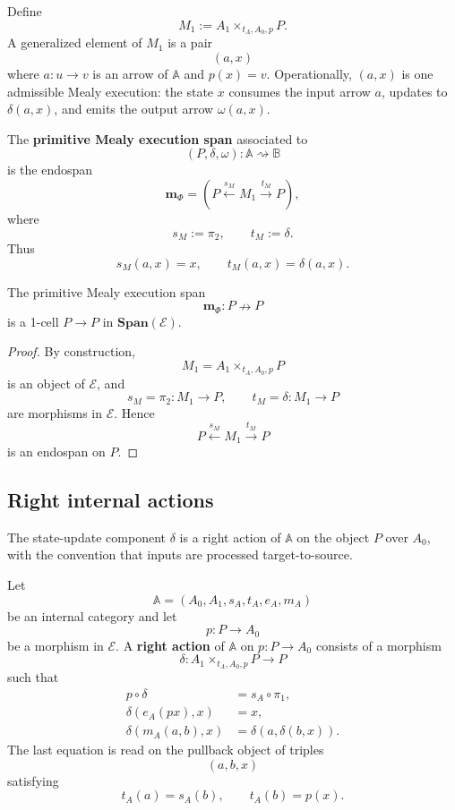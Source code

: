 Define
\[
M_1:=A_1\times_{t_A,A_0,p}P.
\]
A generalized element of \(M_1\) is a pair
\[
(a,x)
\]
where \(a:u\to v\) is an arrow of \(\mathbb A\) and \(p(x)=v\). Operationally, \((a,x)\) is one admissible Mealy execution: the state \(x\) consumes the input arrow \(a\), updates to \(\delta(a,x)\), and emits the output arrow \(\omega(a,x)\).

\begin{definition}
\label{def:primitive-mealy-execution-span}
The \textbf{primitive Mealy execution span} associated to
\[
(P,\delta,\omega):\mathbb A\rightsquigarrow\mathbb B
\]
is the endospan
\[
\mathbf m_\Phi
=
\left(
P
\xleftarrow{s_M}
M_1
\xrightarrow{t_M}
P
\right),
\]
where
\[
s_M:=\pi_2,
\qquad
t_M:=\delta.
\]
Thus
\[
s_M(a,x)=x,
\qquad
t_M(a,x)=\delta(a,x).
\]
\end{definition}

\begin{proposition}
\label{prop:primitive-execution-is-endospan}
The primitive Mealy execution span
\[
\mathbf m_\Phi:P\nrightarrow P
\]
is a 1-cell \(P\to P\) in \(\mathbf{Span}(\mathcal E)\).
\end{proposition}

\begin{proof}
By construction,
\[
M_1=A_1\times_{t_A,A_0,p}P
\]
is an object of \(\mathcal E\), and
\[
s_M=\pi_2:M_1\to P,
\qquad
t_M=\delta:M_1\to P
\]
are morphisms in \(\mathcal E\). Hence
\[
P\xleftarrow{s_M}M_1\xrightarrow{t_M}P
\]
is an endospan on \(P\).
\end{proof}

\subsection{Right internal actions}

The state-update component \(\delta\) is a right action of \(\mathbb A\) on the object \(P\) over \(A_0\), with the convention that inputs are processed target-to-source.

\begin{definition}
\label{def:right-action-internal-category}
Let
\[
\mathbb A=(A_0,A_1,s_A,t_A,e_A,m_A)
\]
be an internal category and let
\[
p:P\to A_0
\]
be a morphism in \(\mathcal E\). A \textbf{right action} of \(\mathbb A\) on \(p:P\to A_0\) consists of a morphism
\[
\delta:A_1\times_{t_A,A_0,p}P\to P
\]
such that
\begin{align}
p\circ\delta&=s_A\circ\pi_1,
\label{eq:right-action-typing}
\\
\delta(e_A(px),x)&=x,
\label{eq:right-action-unit}
\\
\delta(m_A(a,b),x)&=\delta(a,\delta(b,x)).
\label{eq:right-action-composition}
\end{align}
The last equation is read on the pullback object of triples
\[
(a,b,x)
\]
satisfying
\[
t_A(a)=s_A(b),
\qquad
t_A(b)=p(x).
\]
\end{definition}

